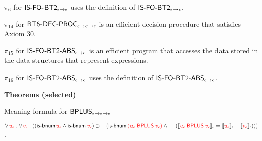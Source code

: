 \documentclass[fleqn]{llncs}
\begin{document}
\begin{biformthy}
    \item $\pi_6$ for $\mbox{\sf IS-FO-BT2}_{\epsilon \rightarrow \epsilon}$
      uses the definition of $\mbox{\sf IS-FO-BT2}_{\epsilon \rightarrow
        \epsilon}$.

    \iffalse

    \item $\pi_{11}$ for $\mname{BT5-DEC-PROC}_{\epsilon \tarrow
      \epsilon \tarrow \epsilon}$ is an efficient decision procedure
      that satisfies Axiom 28.

    \item $\pi_{12}$ for $\mname{IS-FO-BT1-ABS}_{\epsilon \tarrow
      \epsilon}$ is an efficient program that accesses the data stored
      in the data structures that represent expressions.

    \item $\pi_{13}$ for $\mname{IS-FO-BT1-ABS}_{\epsilon \tarrow
      \epsilon}$ uses the definition of
      $\mname{IS-FO-BT1-ABS}_{\epsilon \tarrow \epsilon}$.  

    \fi

    \setcounter{enumi}{13}

    \item $\pi_{14}$ for $\mbox{\sf BT6-DEC-PROC}_{\epsilon \rightarrow
      \epsilon \rightarrow \epsilon}$ is an efficient decision procedure
      that satisfies Axiom 30.

    \item $\pi_{15}$ for $\mbox{\sf IS-FO-BT2-ABS}_{\epsilon \rightarrow
      \epsilon}$ is an efficient program that accesses the data stored
      in the data structures that represent expressions.

    \item $\pi_{16}$ for $\mbox{\sf IS-FO-BT2-ABS}_{\epsilon \rightarrow
      \epsilon}$ uses the definition of
      $\mbox{\sf IS-FO-BT2-ABS}_{\epsilon \rightarrow \epsilon}$.

  \ee

  \item[] \textbf{Theorems (selected)}

    \be

      \setcounter{enumi}{2}

      \item Meaning formula for 
      $\mbox{\sf BPLUS}_{\epsilon \rightarrow \epsilon \rightarrow \epsilon}$

      $\forall\, \textcolor{red}{u_\epsilon} \mathrel. \forall\, \textcolor{red}{v_\epsilon} \mathrel.
      ((\mbox{\sf is-bnum} \, \textcolor{red}{u_\epsilon} \wedge \mbox{\sf is-bnum} \, \textcolor{red}{v_\epsilon}) 
      \supset {}\\
      \hspace*{2ex}(\mbox{\sf is-bnum} \, 
      \textcolor{red}{(u_\epsilon \; \mbox{\sf BPLUS} \; v_\epsilon)} \wedge {}
      \hspace*{2.8ex}(\llbracket\textcolor{red}{u_\epsilon \; \mbox{\sf BPLUS} \; 
      v_\epsilon}\rrbracket_\iota = 
      \llbracket\textcolor{red}{u_\epsilon}\rrbracket_\iota + \llbracket\textcolor{red}{v_\epsilon}\rrbracket_\iota)))$.

    \ee

\ei
\end{biformthy}
\end{document}
